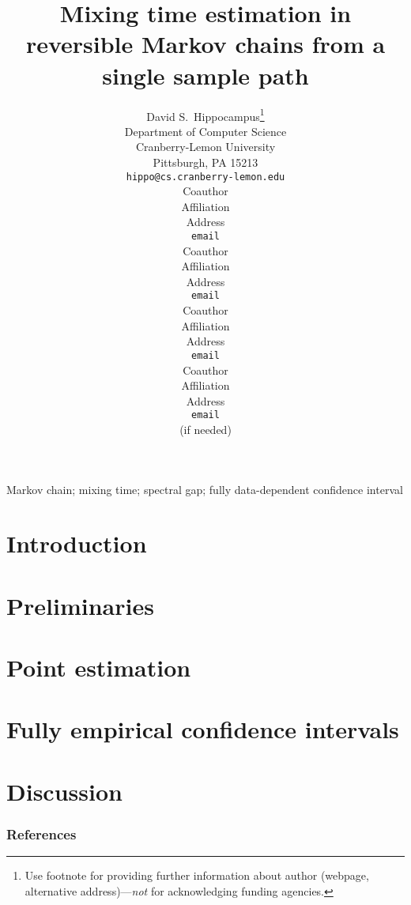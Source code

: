 \documentclass{article}
\title{%
  Mixing time estimation in reversible Markov chains from a single
  sample path%
}
\author{
David S.~Hippocampus\thanks{ Use footnote for providing further information
about author (webpage, alternative address)---\emph{not} for acknowledging
funding agencies.} \\
Department of Computer Science\\
Cranberry-Lemon University\\
Pittsburgh, PA 15213 \\
\texttt{hippo@cs.cranberry-lemon.edu} \\
\And
Coauthor \\
Affiliation \\
Address \\
\texttt{email} \\
\AND
Coauthor \\
Affiliation \\
Address \\
\texttt{email} \\
\And
Coauthor \\
Affiliation \\
Address \\
\texttt{email} \\
\And
Coauthor \\
Affiliation \\
Address \\
\texttt{email} \\
(if needed)\\
}
\begin{document}
\begin{bibunit}[myunsrt]
  \maketitle

  \begin{abstract} 
  
  \end{abstract} 

  \begin{keywords}
    Markov chain; mixing time; spectral gap;
    fully data-dependent confidence interval
  \end{keywords}
  \fi

  \section{Introduction}\label{sec:intro}
  

%  

  \section{Preliminaries}\label{sec:prelim}
  

  \section{Point estimation}\label{sec:rates}
  

  \section{Fully empirical confidence intervals}\label{sec:empirical}
  

  \section{Discussion}\label{sec:discussion}
  

  \subsubsection*{References}
  {\def\section*#1{}\small\putbib[all]}
\end{bibunit}
\end{document}
